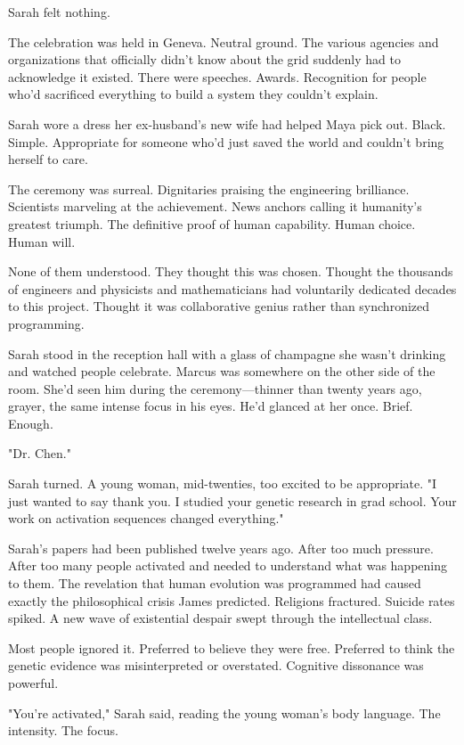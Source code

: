 Sarah felt nothing.

\scenebreak

The celebration was held in Geneva. Neutral ground. The various agencies and organizations that officially didn't know about the grid suddenly had to acknowledge it existed. There were speeches. Awards. Recognition for people who'd sacrificed everything to build a system they couldn't explain.

Sarah wore a dress her ex-husband's new wife had helped Maya pick out. Black. Simple. Appropriate for someone who'd just saved the world and couldn't bring herself to care.

The ceremony was surreal. Dignitaries praising the engineering brilliance. Scientists marveling at the achievement. News anchors calling it humanity's greatest triumph. The definitive proof of human capability. Human choice. Human will.

None of them understood. They thought this was chosen. Thought the thousands of engineers and physicists and mathematicians had voluntarily dedicated decades to this project. Thought it was collaborative genius rather than synchronized programming.

Sarah stood in the reception hall with a glass of champagne she wasn't drinking and watched people celebrate. Marcus was somewhere on the other side of the room. She'd seen him during the ceremony—thinner than twenty years ago, grayer, the same intense focus in his eyes. He'd glanced at her once. Brief. Enough.

"Dr. Chen."

Sarah turned. A young woman, mid-twenties, too excited to be appropriate. "I just wanted to say thank you. I studied your genetic research in grad school. Your work on activation sequences changed everything."

Sarah's papers had been published twelve years ago. After too much pressure. After too many people activated and needed to understand what was happening to them. The revelation that human evolution was programmed had caused exactly the philosophical crisis James predicted. Religions fractured. Suicide rates spiked. A new wave of existential despair swept through the intellectual class.

Most people ignored it. Preferred to believe they were free. Preferred to think the genetic evidence was misinterpreted or overstated. Cognitive dissonance was powerful.

"You're activated," Sarah said, reading the young woman's body language. The intensity. The focus.

